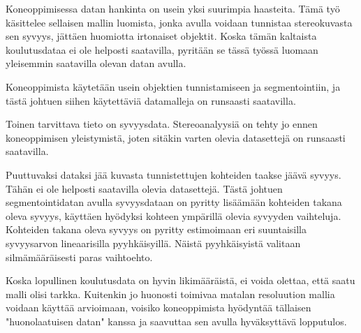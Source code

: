 Koneoppimisessa datan hankinta on usein yksi suurimpia haasteita. 
Tämä työ käsittelee sellaisen mallin luomista, jonka avulla voidaan tunnistaa stereokuvasta sen syvyys, jättäen huomiotta irtonaiset objektit.
Koska tämän kaltaista koulutusdataa ei ole helposti saatavilla, pyritään se tässä työssä luomaan yleisemmin saatavilla olevan datan avulla. 

Koneoppimista käytetään usein objektien tunnistamiseen ja segmentointiin, ja tästä johtuen siihen käytettäviä datamalleja on runsaasti saatavilla.

Toinen tarvittava tieto on syvyysdata. 
Stereoanalyysiä on tehty jo ennen koneoppimisen yleistymistä, joten sitäkin varten olevia datasettejä on runsaasti saatavilla. 

Puuttuvaksi dataksi jää kuvasta tunnistettujen kohteiden taakse jäävä syvyys. Tähän ei ole helposti saatavilla olevia datasettejä.
Tästä johtuen segmentointidatan avulla syvyysdataan on pyritty lisäämään kohteiden takana oleva syvyys, käyttäen hyödyksi kohteen ympärillä olevia syvyyden vaihteluja.
Kohteiden takana oleva syvyys on pyritty estimoimaan eri suuntaisilla syvyysarvon lineaarisilla pyyhkäisyillä.
Näistä pyyhkäisyistä valitaan silmämääräisesti paras vaihtoehto.

Koska lopullinen koulutusdata on hyvin likimääräistä, ei voida olettaa, että saatu malli olisi tarkka.
Kuitenkin jo huonosti toimivaa matalan resoluution mallia voidaan käyttää arvioimaan,
voisiko koneoppimista hyödyntää tällaisen "huonolaatuisen datan" kanssa ja saavuttaa sen avulla hyväksyttävä lopputulos.
